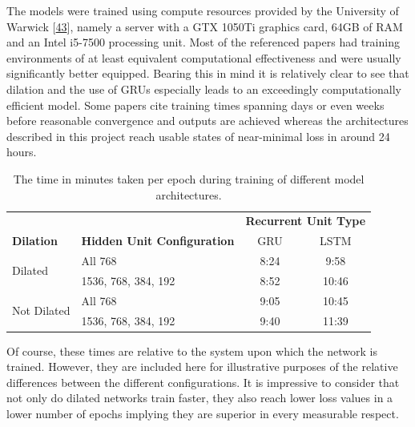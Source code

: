 \documentclass[12pt,]{article}
\begin{document}
The models were trained using compute resources provided by the
University of Warwick
{[}\protect\hyperlink{ref-warwickcomputenodes}{43}{]}, namely a server
with a GTX 1050Ti graphics card, 64GB of RAM and an Intel i5-7500
processing unit. Most of the referenced papers had training environments
of at least equivalent computational effectiveness and were usually
significantly better equipped. Bearing this in mind it is relatively
clear to see that dilation and the use of GRUs especially leads to an
exceedingly computationally efficient model. Some papers cite training
times spanning days or even weeks before reasonable convergence and
outputs are achieved whereas the architectures described in this project
reach usable states of near-minimal loss in around 24 hours.

\setlength\extrarowheight{1pt}
\begin{table}[H]
\centering
\caption{The time in minutes taken per epoch during training of different model architectures.}
\vspace{1em}
\begin{tabular}{llcc} 
\toprule
                             &                                    & \multicolumn{2}{c}{\textbf{Recurrent Unit Type}}  \\
\textbf{Dilation}            & \textbf{Hidden Unit Configuration} & GRU   & LSTM                                      \\ 
\hline
\multirow{2}{*}{Dilated}     & All 768                            & 8:24  & 9:58                                      \\ 
                             & 1536, 768, 384, 192                & 8:52  & 10:46                                     \\ 
\multirow{2}{*}{Not Dilated} & All 768                            & 9:05  & 10:45                                     \\ 
                             & 1536, 768, 384, 192                & 9:40  & 11:39                                     \\
\bottomrule
\end{tabular}
\end{table}

Of course, these times are relative to the system upon which the network
is trained. However, they are included here for illustrative purposes of
the relative differences between the different configurations. It is
impressive to consider that not only do dilated networks train faster,
they also reach lower loss values in a lower number of epochs implying
they are superior in every measurable respect.
\end{document}
